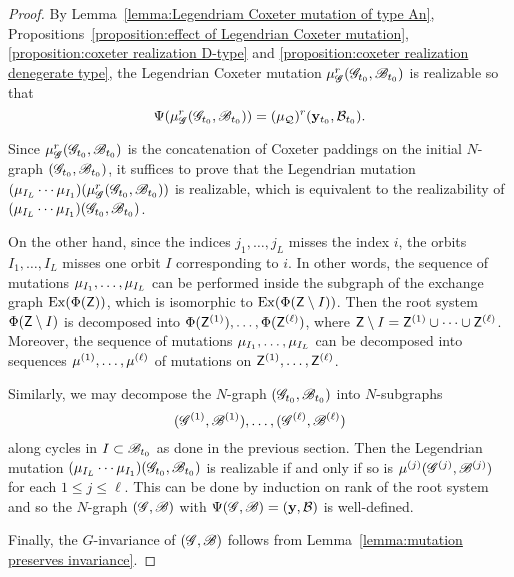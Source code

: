 \begin{proof}
By Lemma~\ref{lemma:Legendriam Coxeter mutation of type An}, Propositions~\ref{proposition:effect of Legendrian Coxeter mutation}, \ref{proposition:coxeter realization D-type} and \ref{proposition:coxeter realization denegerate type}, the Legendrian Coxeter mutation $\mu_\mathscr{G}^r(\mathscr{G}_{t_0}, \mathscr{B}_{t_0})$ is realizable so that
\[
\Psi(\mu_\mathscr{G}^r(\mathscr{G}_{t_0}, \mathscr{B}_{t_0}))
=(\mu_\mathcal{Q})^r(\mathbf{y}_{t_0},\mathcal{B}_{t_0}).
\]

Since $\mu_\mathscr{G}^r(\mathscr{G}_{t_0}, \mathscr{B}_{t_0})$ is the concatenation of Coxeter paddings on the initial $N$-graph $(\mathscr{G}_{t_0},\mathscr{B}_{t_0})$, it suffices to prove that the Legendrian mutation
$(\mu_{I_L}\cdots\mu_{I_1})(\mu_\mathscr{G}^r(\mathscr{G}_{t_0}, \mathscr{B}_{t_0}))$
is realizable, which is equivalent to the realizability of
$(\mu_{I_L}\cdots\mu_{I_1})(\mathscr{G}_{t_0}, \mathscr{B}_{t_0})$.

On the other hand, since the indices $j_1,\dots, j_L$ misses the index $i$, the orbits $I_1,\dots, I_L$ misses one orbit $I$ corresponding to $i$.
In other words, the sequence of mutations $\mu_{I_1},\dots,\mu_{I_L}$ can be performed inside the subgraph of the exchange graph $\operatorname{Ex}(\Phi(\mathsf{Z}))$, which is isomorphic to $\operatorname{Ex}(\Phi(\mathsf{Z} \setminus I))$.
Then the root system $\Phi(\mathsf{Z}\setminus I)$ is decomposed into $\Phi(\mathsf{Z}^{(1)}), \dots, \Phi(\mathsf{Z}^{(\ell)})$, where $\mathsf{Z}\setminus I = \mathsf{Z}^{(1)}\cup\cdots\cup\mathsf{Z}^{(\ell)}$.
Moreover, the sequence of mutations $\mu_{I_1},\dots,\mu_{I_L}$ can be decomposed into sequences $\mu^{(1)},\dots, \mu^{(\ell)}$ of mutations on $\mathsf{Z}^{(1)},\dots,\mathsf{Z}^{(\ell)}$.

Similarly, we may decompose the $N$-graph $(\mathscr{G}_{t_0}, \mathscr{B}_{t_0})$ into $N$-subgraphs 
\[
(\mathscr{G}^{(1)}, \mathscr{B}^{(1)}),\dots,(\mathscr{G}^{(\ell)}, \mathscr{B}^{(\ell)})
\]
along cycles in $I\subset\mathscr{B}_{t_0}$ as done in the previous section.
Then the Legendrian mutation $(\mu_{I_L}\cdots\mu_{I_1})(\mathscr{G}_{t_0},\mathscr{B}_{t_0})$ is realizable if and only if so is $\mu^{(j)}(\mathscr{G}^{(j)},\mathscr{B}^{(j)})$ for each $1\le j\le \ell$.
This can be done by induction on rank of the root system and so the $N$-graph $(\mathscr{G}, \mathscr{B})$ with $\Psi(\mathscr{G},\mathscr{B})=(\mathbf{y},\mathcal{B})$ is well-defined.

Finally, the $G$-invariance of $(\mathscr{G}, \mathscr{B})$ follows from Lemma~\ref{lemma:mutation preserves invariance}.
\end{proof}


